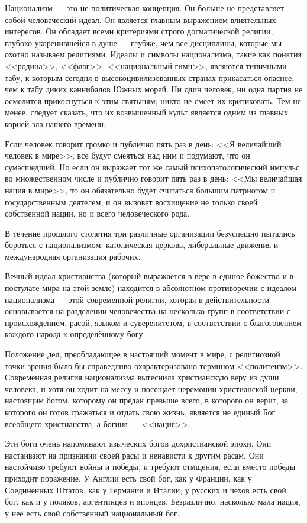 Национализм — это не политическая концепция. Он больше не представляет собой человеческий идеал. Он является главным выражением влиятельных интересов. Он обладает всеми критериями строго догматической религии, глубоко укоренившейся в душе — глубже, чем все дисциплины, которые мы охотно называем религиями. Идеалы и символы национализма, такие как понятия <<родина>>, <<флаг>>, <<национальный гимн>>, являются типичными табу, к которым сегодня в высокоцивилизованных странах прикасаться опаснее, чем к табу диких каннибалов Южных морей. Ни один человек, ни одна партия не осмелится прикоснуться к этим святыням; никто не смеет их критиковать. Тем не менее, следует сказать, что их возвышенный культ является одним из главных корней зла нашего времени.

Если человек говорит громко и публично пять раз в день: <<Я величайший человек в мире>>, все будут смеяться над ним и подумают, что он сумасшедший. Но если он выражает тот же самый психопатологический импульс во множественном числе и публично говорит пять раз в день: <<Мы величайшая нация в мире>>, то он обязательно будет считаться большим патриотом и государственным деятелем, и он вызовет восхищение не только своей собственной нации, но и всего человеческого рода.

В течение прошлого столетия три различные организации безуспешно пытались бороться с национализмом: католическая церковь, либеральные движения и международная организация рабочих.

Вечный идеал христианства (который выражается в вере в единое божество и в постулате мира на этой земле) находится в абсолютном противоречии с идеалом национализма — этой современной религии, которая в действительности основывается на разделении человечества на несколько групп в соответствии с происхождением, расой, языком и суверенитетом, в соответствии с благоговением каждого народа к определённому богу.

Положение дел, преобладающее в настоящий момент в мире, с религиозной точки зрения было бы справедливо охарактеризовано термином <<политеизм>>. Современная религия национализма вытеснила христианскую веру из души человека, и хотя он ходит на мессу и посещает церемонии христианской церкви, настоящим богом, которому он предан превыше всего, в которого он верит, за которого он готов сражаться и отдать свою жизнь, является не единый Бог всеобщего христианства, а богиня — <<нация>>.

Эти боги очень напоминают языческих богов дохристианской эпохи. Они настаивают на признании своей расы и ненависти к другим расам. Они настойчиво требуют войны и победы, и требуют отмщения, если вместо победы приходит поражение. У Англии есть свой бог, как у Франции, как у Соединенных Штатов, как у Германии и Италии; у русских и чехов есть свой бог, как и у поляков, аргентинцев и японцев. Безразлично, насколько мала нация, у неё есть свой собственный национальный бог.

